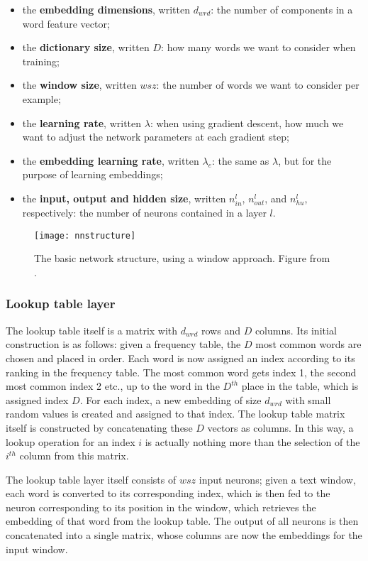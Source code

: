 \begin{itemize}
\item the \textbf{embedding dimensions}, written $d_{wrd}$: the number of
  components in a word feature vector;
\item the \textbf{dictionary size}, written $D$: how many words we want to consider
  when training;
\item the \textbf{window size}, written $wsz$: the number of words we want to
  consider per example;
\item the \textbf{learning rate}, written $\lambda$: when using gradient descent,
  how much we want to adjust the network parameters at each gradient
  step;
\item the \textbf{embedding learning rate}, written $\lambda_{e}$: the same as
  $\lambda$, but for the purpose of learning embeddings;
\item the \textbf{input, output and hidden size}, written $n^l_{in}$, $n^l_{out}$, and $n^l_{hu}$, respectively: the number of neurons
  contained in a layer $l$.
\end{itemize}

\begin{figure}
  \texttt{[image: nnstructure]}
  \caption{The basic network structure, using a window approach. Figure from \cite[2499]{collobert-2011}.} \label{fig:nnstructure}
\end{figure}

\subsubsection{Lookup table layer}
The lookup table itself is a matrix with $d_{wrd}$ rows and $D$
columns. Its initial construction is as follows: given a frequency
table, the $D$ most common words are chosen and placed in order. Each
word is now assigned an index according to its ranking in the
frequency table. The most common word gets index 1, the second most
common index 2 etc., up to the word in the $D^{th}$ place in the
table, which is assigned index $D$. For each index, a new embedding of
size $d_{wrd}$ with small random values is created and assigned to
that index. The lookup table matrix itself is constructed by
concatenating these $D$ vectors as columns.  In this way, a lookup
operation for an index $i$ is actually nothing more than the selection
of the $i^{th}$ column from this matrix.

The lookup table layer itself consists of $wsz$ input neurons; given a
text window, each word is converted to its corresponding index, which
is then fed to the neuron corresponding to its position in the window,
which retrieves the embedding of that word from the lookup table. The
output of all neurons is then concatenated into a single matrix, whose
columns are now the embeddings for the input window. 

